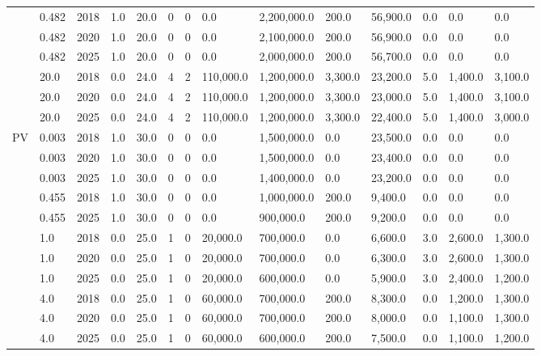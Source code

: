 \begin{table*}[]
\begin{tabularx}{\linewidth}{|p{}|l|c|l|l|l|l|l|l|l|l|l|l|l|}
& 0.482 & 2018 & 1.0 & 20.0 & 0 & 0 & 0.0 & 2,200,000.0 & 200.0 & 56,900.0 & 0.0 & 0.0 & 0.0 \\ \cline{2-14} 
& 0.482 & 2020 & 1.0 & 20.0 & 0 & 0 & 0.0 & 2,100,000.0 & 200.0 & 56,900.0 & 0.0 & 0.0 & 0.0 \\ \cline{2-14} 
& 0.482 & 2025 & 1.0 & 20.0 & 0 & 0 & 0.0 & 2,000,000.0 & 200.0 & 56,700.0 & 0.0 & 0.0 & 0.0 \\ \cline{2-14} 
& 20.0 & 2018 & 0.0 & 24.0 & 4 & 2 & 110,000.0 & 1,200,000.0 & 3,300.0 & 23,200.0 & 5.0 & 1,400.0 & 3,100.0 \\ \cline{2-14} 
& 20.0 & 2020 & 0.0 & 24.0 & 4 & 2 & 110,000.0 & 1,200,000.0 & 3,300.0 & 23,000.0 & 5.0 & 1,400.0 & 3,100.0 \\ \cline{2-14} 
& 20.0 & 2025 & 0.0 & 24.0 & 4 & 2 & 110,000.0 & 1,200,000.0 & 3,300.0 & 22,400.0 & 5.0 & 1,400.0 & 3,000.0 \\ \hline
\multirow{14}{*}{PV} & 0.003 & 2018 & 1.0 & 30.0 & 0 & 0 & 0.0 & 1,500,000.0 & 0.0 & 23,500.0 & 0.0 & 0.0 & 0.0 \\ \cline{2-14} 
& 0.003 & 2020 & 1.0 & 30.0 & 0 & 0 & 0.0 & 1,500,000.0 & 0.0 & 23,400.0 & 0.0 & 0.0 & 0.0 \\ \cline{2-14} 
& 0.003 & 2025 & 1.0 & 30.0 & 0 & 0 & 0.0 & 1,400,000.0 & 0.0 & 23,200.0 & 0.0 & 0.0 & 0.0 \\ \cline{2-14} 
& 0.455 & 2018 & 1.0 & 30.0 & 0 & 0 & 0.0 & 1,000,000.0 & 200.0 & 9,400.0 & 0.0 & 0.0 & 0.0 \\ \cline{2-14} 
& 0.455 & 2025 & 1.0 & 30.0 & 0 & 0 & 0.0 & 900,000.0 & 200.0 & 9,200.0 & 0.0 & 0.0 & 0.0 \\ \cline{2-14} 
& 1.0 & 2018 & 0.0 & 25.0 & 1 & 0 & 20,000.0 & 700,000.0 & 0.0 & 6,600.0 & 3.0 & 2,600.0 & 1,300.0 \\ \cline{2-14} 
& 1.0 & 2020 & 0.0 & 25.0 & 1 & 0 & 20,000.0 & 700,000.0 & 0.0 & 6,300.0 & 3.0 & 2,600.0 & 1,300.0 \\ \cline{2-14} 
& 1.0 & 2025 & 0.0 & 25.0 & 1 & 0 & 20,000.0 & 600,000.0 & 0.0 & 5,900.0 & 3.0 & 2,400.0 & 1,200.0 \\ \cline{2-14} 
& 4.0 & 2018 & 0.0 & 25.0 & 1 & 0 & 60,000.0 & 700,000.0 & 200.0 & 8,300.0 & 0.0 & 1,200.0 & 1,300.0 \\ \cline{2-14} 
& 4.0 & 2020 & 0.0 & 25.0 & 1 & 0 & 60,000.0 & 700,000.0 & 200.0 & 8,000.0 & 0.0 & 1,100.0 & 1,300.0 \\ \cline{2-14} 
& 4.0 & 2025 & 0.0 & 25.0 & 1 & 0 & 60,000.0 & 600,000.0 & 200.0 & 7,500.0 & 0.0 & 1,100.0 & 1,200.0 \\ \cline{2-14} 

\end{tabularx}
\end{table*}
